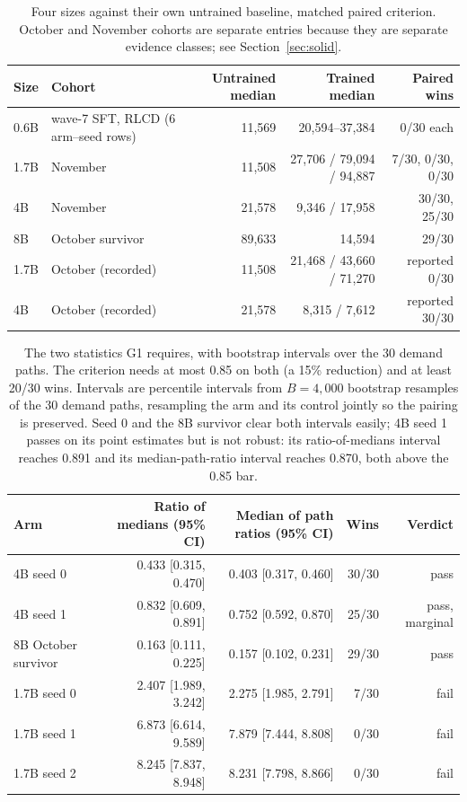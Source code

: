 \documentclass[11pt]{article}
\begin{document}
\begin{table}[ht]
\centering
\caption{Four sizes against their own untrained baseline, matched paired criterion. October and
November cohorts are separate entries because they are separate evidence classes; see
Section~\ref{sec:solid}.}
\label{tab:rungs}
\small
\begin{tabular}{@{}llrrr@{}}
\toprule
Size & Cohort & Untrained median & Trained median & Paired wins \\
\midrule
0.6B & wave-7 SFT, RLCD (6 arm--seed rows) & 11{,}569 & 20{,}594--37{,}384 & 0/30 each \\
1.7B & November & 11{,}508 & 27{,}706 / 79{,}094 / 94{,}887 & 7/30, 0/30, 0/30 \\
4B & November & 21{,}578 & 9{,}346 / 17{,}958 & 30/30, 25/30 \\
8B & October survivor & 89{,}633 & 14{,}594 & 29/30 \\
\midrule
1.7B & October (recorded) & 11{,}508 & 21{,}468 / 43{,}660 / 71{,}270 & reported 0/30 \\
4B & October (recorded) & 21{,}578 & 8{,}315 / 7{,}612 & reported 30/30 \\
\bottomrule
\end{tabular}
\end{table}

\begin{table}[ht]
\centering
\caption{The two statistics G1 requires, with bootstrap intervals over the 30 demand paths. The
criterion needs at most 0.85 on both (a 15\% reduction) and at least 20/30 wins. Intervals are
percentile intervals from $B=4{,}000$ bootstrap resamples of the 30 demand paths, resampling the arm and
its control jointly so the pairing is preserved. Seed 0 and the 8B survivor clear both intervals easily;
4B seed 1 passes on its point estimates but is not robust: its ratio-of-medians interval reaches 0.891
and its median-path-ratio interval reaches 0.870, both above the 0.85 bar.}
\label{tab:g1}
\small
\begin{tabular}{@{}lrrrr@{}}
\toprule
Arm & Ratio of medians (95\% CI) & Median of path ratios (95\% CI) & Wins & Verdict \\
\midrule
4B seed 0 & 0.433 [0.315, 0.470] & 0.403 [0.317, 0.460] & 30/30 & pass \\
4B seed 1 & 0.832 [0.609, 0.891] & 0.752 [0.592, 0.870] & 25/30 & pass, marginal \\
8B October survivor & 0.163 [0.111, 0.225] & 0.157 [0.102, 0.231] & 29/30 & pass \\
1.7B seed 0 & 2.407 [1.989, 3.242] & 2.275 [1.985, 2.791] & 7/30 & fail \\
1.7B seed 1 & 6.873 [6.614, 9.589] & 7.879 [7.444, 8.808] & 0/30 & fail \\
1.7B seed 2 & 8.245 [7.837, 8.948] & 8.231 [7.798, 8.866] & 0/30 & fail \\
\bottomrule
\end{tabular}
\end{table}
\end{document}
